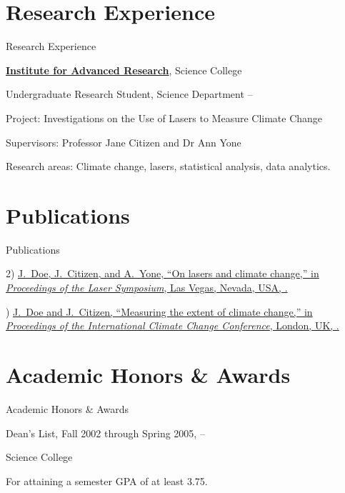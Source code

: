 \documentclass[a4paper,10pt,oneside]{article}
\begin{document}
\begin{body}

\section{Research Experience}
{Research Experience}

\href{http://www.example.com/my-institute}
{\textbf{Institute for Advanced Research}},
Science College
\par
Undergraduate Research Student, Science Department
\hfill
{} --
\begin{detail}
Project:
Investigations on the Use of Lasers to Measure Climate Change
\par
Supervisors:
Professor Jane Citizen and
Dr Ann Yone
\par
Research areas:
Climate change, lasers, statistical analysis, data analytics.
\end{detail}


\section{Publications}
{Publications}

2)\bibgap
\href{http://www.example.com/my-paper-doi-2}
{\underline{J.~Doe}, J.~Citizen, and A.~Yone,
``On lasers and climate change,''
in \textit{Proceedings of the Laser Symposium},
Las Vegas, Nevada, USA,
.}

)\bibgap
\href{http://www.example.com/my-paper-doi-1}
{\underline{J.~Doe} and J.~Citizen,
``Measuring the extent of climate change,''
in \textit{Proceedings of the International Climate Change Conference},
London, UK,
.}


\section{Academic Honors \& Awards}
{Academic Honors\newline
\& Awards}

Dean's List,
Fall 2002 through Spring 2005,
\hfill
{} --
\par
Science College
\begin{detail}
For attaining a semester GPA of at least 3.75.
\end{detail}


\end{body}
\end{document}
